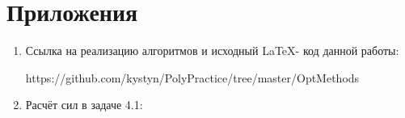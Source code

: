 \chapter*{Приложения}

\begin{enumerate}
\item Ссылка на реализацию алгоритмов и исходный \LaTeX - код данной работы: 

https://github.com/kystyn/PolyPractice/tree/master/OptMethods

\item Расчёт сил в задаче 4.1:

\end{enumerate}



\printbibliography
{}

